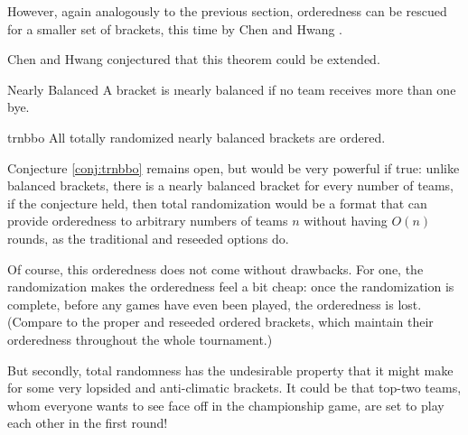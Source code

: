 {{        %
    }{}

    However, again analogously to the previous section, orderedness can be rescued for a smaller set of brackets, this time by Chen and Hwang \cite{totally_random_balanced}.


    Chen and Hwang conjectured that this theorem could be extended.

    \begin{definition}{Nearly Balanced}{}
        A bracket is \i{nearly balanced} if no team receives more than one bye.
    \end{definition}

    \begin{conj}{}{trnbbo}
        All totally randomized nearly balanced brackets are ordered.
    \end{conj}

    Conjecture \ref{conj:trnbbo} remains open, but would be very powerful if true: unlike balanced brackets, there is a nearly balanced bracket for every number of teams, if the conjecture held, then total randomization would be a format that can provide orderedness to arbitrary numbers of teams $n$ without having $O(n)$ rounds, as the traditional and reseeded options do.

    Of course, this orderedness does not come without drawbacks. For one, the randomization makes the orderedness feel a bit cheap: once the randomization is complete, before any games have even been played, the orderedness is lost. (Compare to the proper and reseeded ordered brackets, which maintain their orderedness throughout the whole tournament.)

    But secondly, total randomness has the undesirable property that it might make for some very lopsided and anti-climatic brackets. It could be that top-two teams, whom everyone wants to see face off in the championship game, are set to play each other in the first round!

}

